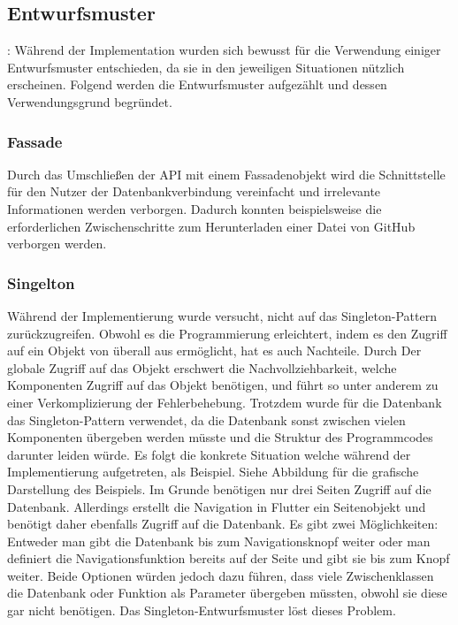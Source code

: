 \subsection{Entwurfsmuster}: %
Während der Implementation wurden sich bewusst für die Verwendung einiger Entwurfsmuster entschieden, da sie in den jeweiligen Situationen nützlich erscheinen. %
Folgend werden die Entwurfsmuster aufgezählt und dessen Verwendungsgrund begründet.%
%
%
%
%
%
%
%
%
%
%
\subsubsection{Fassade}
Durch das Umschließen der API mit einem Fassadenobjekt wird die Schnittstelle für den Nutzer der Datenbankverbindung vereinfacht und irrelevante Informationen werden verborgen. Dadurch konnten beispielsweise die erforderlichen Zwischenschritte zum Herunterladen einer Datei von GitHub verborgen werden.
%
%
%
%
%
%
\subsubsection{Singelton}%
Während der Implementierung wurde versucht, nicht auf das Singleton-Pattern zurückzugreifen. 
	Obwohl es die Programmierung erleichtert, indem es den Zugriff auf ein Objekt von überall aus ermöglicht, hat es auch Nachteile. %
	Durch Der globale Zugriff auf das Objekt erschwert die Nachvollziehbarkeit, welche Komponenten Zugriff auf das Objekt benötigen, und führt so unter anderem zu einer Verkomplizierung der Fehlerbehebung. %
Trotzdem wurde für die Datenbank das Singleton-Pattern verwendet, da die Datenbank sonst zwischen vielen Komponenten übergeben werden müsste und die Struktur des Programmcodes darunter leiden würde.\newline%
Es folgt die konkrete Situation welche während der Implementierung aufgetreten, als Beispiel. Siehe Abbildung  für die grafische Darstellung des Beispiels. Im Grunde benötigen nur drei Seiten Zugriff auf die Datenbank. Allerdings erstellt die Navigation in Flutter ein Seitenobjekt und benötigt daher ebenfalls Zugriff auf die Datenbank. Es gibt zwei Möglichkeiten: Entweder man gibt die Datenbank bis zum Navigationsknopf weiter oder man definiert die Navigationsfunktion bereits auf der Seite und gibt sie bis zum Knopf weiter. Beide Optionen würden jedoch dazu führen, dass viele Zwischenklassen die Datenbank oder Funktion als Parameter übergeben müssten, obwohl sie diese gar nicht benötigen. Das Singleton-Entwurfsmuster löst dieses Problem.
%
%
%
%
%
